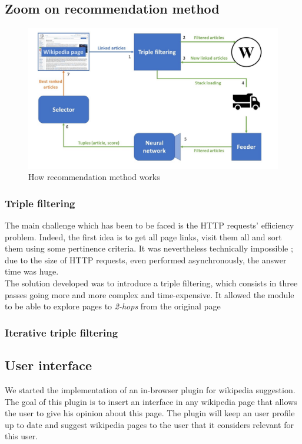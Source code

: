 \documentclass[11pt]{article}
\theoremstyle{plain}
\theoremstyle{definition}
\theoremstyle{remark}
\begin{document}
\subsection{Zoom on recommendation method}

\begin{figure}[h!]
	\centering
    \includegraphics[width=400pt]{diagram_zoom.png}
    \caption{How recommendation method works}
    \label{arch_glo}
\end{figure}

\subsubsection{Triple filtering}

The main challenge which has been to be faced is the HTTP requests' efficiency problem. Indeed, the first idea is to get all page links, visit them all and sort them using some pertinence criteria. It was nevertheless technically impossible ; due to the size of HTTP requests, even performed asynchronously, the answer time was huge. \\

The solution developed was to introduce a triple filtering, which consists in three passes going more and more complex and time-expensive. It allowed the module to be able to explore pages to \textit{2-hops} from the original page

\subsubsection{Iterative triple filtering}

\subsection{User interface}
We started the implementation of an in-browser plugin for wikipedia suggestion.
The goal of this plugin is to insert an interface in any wikipedia page that allows the user to give his opinion about this page. The plugin will keep an user profile up to date and suggest wikipedia pages to the user that it considers relevant for this user.
\end{document}
